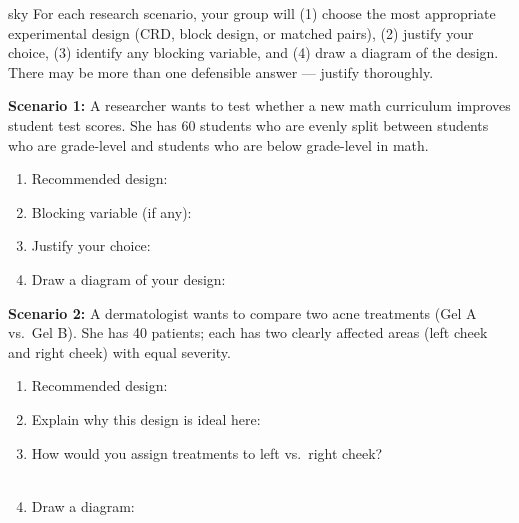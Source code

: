 \documentclass[10pt]{article}
\begin{document}
\namepartnerperiod

\vspace{0.1in}

\begin{scenariobox}[Context]{sky}
\small
For each research scenario, your group will (1) choose the most appropriate
experimental design (CRD, block design, or matched pairs), (2) justify your
choice, (3) identify any blocking variable, and (4) draw a diagram of the design.
There may be more than one defensible answer --- justify thoroughly.
\end{scenariobox}

\vspace{0.1in}

\textbf{Scenario 1:} A researcher wants to test whether a new math curriculum improves
student test scores. She has 60 students who are evenly split between students who
are grade-level and students who are below grade-level in math.

\begin{practicebox}
\small
\begin{enumerate}[leftmargin=1.5em, itemsep=8pt]
  \item Recommended design: \blank{6cm}
  \item Blocking variable (if any): \blank{6cm}
  \item Justify your choice: \blank{9cm}\\
        \writeline
  \item Draw a diagram of your design:
  \vspace{1.4in}
\end{enumerate}
\end{practicebox}

\vspace{0.1in}

\textbf{Scenario 2:} A dermatologist wants to compare two acne treatments (Gel A
vs.\ Gel B). She has 40 patients; each has two clearly affected areas (left cheek
and right cheek) with equal severity.

\begin{practicebox}
\small
\begin{enumerate}[leftmargin=1.5em, itemsep=8pt]
  \item Recommended design: \blank{6cm}
  \item Explain why this design is ideal here: \blank{9cm}\\
        \writeline
  \item How would you assign treatments to left vs.\ right cheek?\\
        \writeline\\[1pt]\writeline
  \item Draw a diagram:
  \vspace{1.2in}
\end{enumerate}
\end{practicebox}
\end{document}
